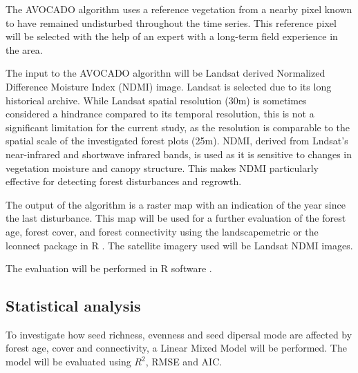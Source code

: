 The AVOCADO algorithm uses a reference vegetation from a nearby pixel known to have remained undisturbed throughout the time series. This reference pixel will be selected with the help of an expert with a long-term field experience in the area. 

The input to the AVOCADO algorithn will be Landsat derived Normalized Difference Moisture Index (NDMI) image. Landsat is selected due to its long historical archive. While Landsat spatial resolution (30m) is sometimes considered a hindrance compared to its temporal resolution, this is not a significant limitation for the current study, as the resolution is comparable to the spatial scale of the investigated forest plots (25m). NDMI, derived from Lndsat's near-infrared and shortwave infrared bands, is used as it is sensitive to changes in vegetation moisture and canopy structure. This makes NDMI particularly effective for detecting forest disturbances and regrowth.

The output of the algorithm is a raster map with an indication of the year since the last disturbance. This map will be used for a further evaluation of the forest age, forest cover, and forest connectivity using the landscapemetric or the lconnect package in R \citep{mestreLconnectPackageVersatile2023, hesselbarthLandscapemetricsOpensourceTool2019}. The satellite imagery used will be Landsat NDMI images.
\citep{gore}

The evaluation will be performed in R software \citep{R}.

\subsection{Statistical analysis}
To investigate how seed richness, evenness and seed dipersal mode are affected by forest age, cover and connectivity, a Linear Mixed Model will be performed. The model will be evaluated using $R^2$, RMSE and AIC.

 